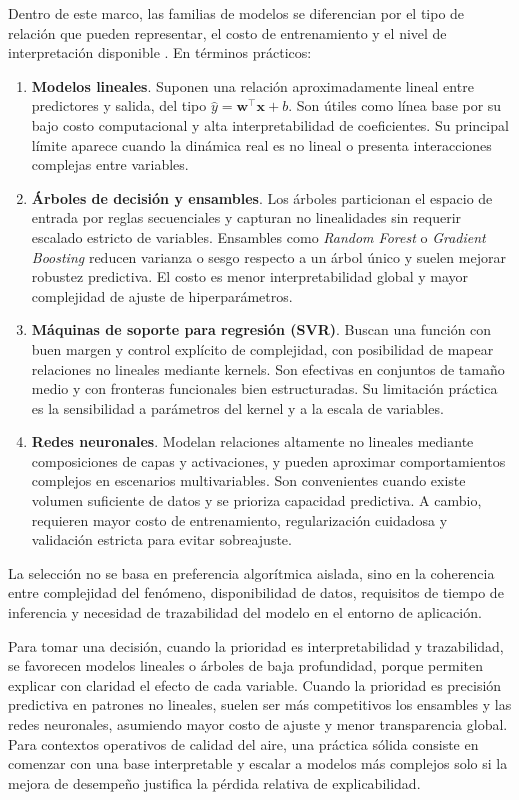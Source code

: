 Dentro de este marco, las familias de modelos se diferencian por el tipo de relación que pueden representar, el costo de entrenamiento y el nivel de interpretación disponible \cite{ARTML01}. En términos prácticos:
\begin{enumerate}
\item \textbf{Modelos lineales}. Suponen una relación aproximadamente lineal entre predictores y salida, del tipo \(\hat{y}=\mathbf{w}^{\top}\mathbf{x}+b\). Son útiles como línea base por su bajo costo computacional y alta interpretabilidad de coeficientes. Su principal límite aparece cuando la dinámica real es no lineal o presenta interacciones complejas entre variables.
\item \textbf{Árboles de decisión y ensambles}. Los árboles particionan el espacio de entrada por reglas secuenciales y capturan no linealidades sin requerir escalado estricto de variables. Ensambles como \textit{Random Forest} o \textit{Gradient Boosting} reducen varianza o sesgo respecto a un árbol único y suelen mejorar robustez predictiva. El costo es menor interpretabilidad global y mayor complejidad de ajuste de hiperparámetros.
\item \textbf{Máquinas de soporte para regresión (SVR)}. Buscan una función con buen margen y control explícito de complejidad, con posibilidad de mapear relaciones no lineales mediante kernels. Son efectivas en conjuntos de tamaño medio y con fronteras funcionales bien estructuradas. Su limitación práctica es la sensibilidad a parámetros del kernel y a la escala de variables.
\item \textbf{Redes neuronales}. Modelan relaciones altamente no lineales mediante composiciones de capas y activaciones, y pueden aproximar comportamientos complejos en escenarios multivariables. Son convenientes cuando existe volumen suficiente de datos y se prioriza capacidad predictiva. A cambio, requieren mayor costo de entrenamiento, regularización cuidadosa y validación estricta para evitar sobreajuste.
\end{enumerate}

La selección no se basa en preferencia algorítmica aislada, sino en la coherencia entre complejidad del fenómeno, disponibilidad de datos, requisitos de tiempo de inferencia y necesidad de trazabilidad del modelo en el entorno de aplicación.

Para tomar una decisión, cuando la prioridad es interpretabilidad y trazabilidad, se favorecen modelos lineales o árboles de baja profundidad, porque permiten explicar con claridad el efecto de cada variable. Cuando la prioridad es precisión predictiva en patrones no lineales, suelen ser más competitivos los ensambles y las redes neuronales, asumiendo mayor costo de ajuste y menor transparencia global. Para contextos operativos de calidad del aire, una práctica sólida consiste en comenzar con una base interpretable y escalar a modelos más complejos solo si la mejora de desempeño justifica la pérdida relativa de explicabilidad.

